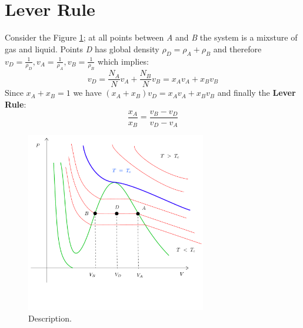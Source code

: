 \documentclass[../main/main.tex]{subfiles}
\begin{document}
\section{Lever Rule}



Consider the Figure \ref{fig:3_0}; at all points between \emph{A} and \emph{B} the system is a mixsture of gas and liquid. Points \emph{D} has global density \( \rho_D = \rho_A + \rho_B \)  and therefore \( v_D = \frac{1}{\rho_D}, v_A = \frac{1}{\rho _A}, v_B = \frac{1}{\rho_B} \) which implies:
\begin{equation}
  v_D = \frac{N_A}{N} v_A + \frac{N_B}{N} v_B = x_A v_A + x_B v_B
  \label{eq:}
\end{equation}
Since \( x_A + x_B = 1 \) we have \( (x_A + x_B)v_D = x_A v_A + x_B v_B \) and finally the \textbf{Lever Rule}:
\begin{equation}
  \frac{x_A}{x_B} = \frac{v_B - v_D}{v_D - v_A}
  \label{eq:}
\end{equation}

\begin{figure}[h!]
\centering
\includegraphics[width=0.7\textwidth]{../lessons/3_image/1.pdf}
\caption{\label{fig:3_0} Description.}
\end{figure}
\end{document}
